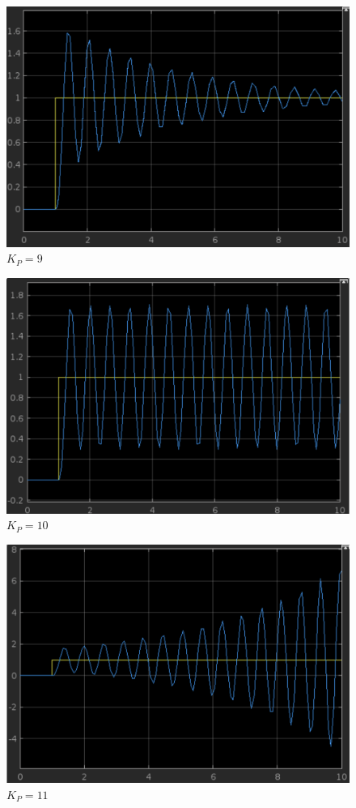 \documentclass{article}
\begin{document}
				\begin{figure}[h]
					\includegraphics[scale=0.225, center]{2_c_KP_9.png}
					\caption{$K_P = 9$}
					\label{fig24: Graph_c_KP_9}
				\end{figure}	
\newpage
				\begin{figure}[h]
					\includegraphics[scale=0.225, center]{2_c_KP_10.png}
					\caption{$K_P = 10$}
					\label{fig25: Graph_c_KP_10}
				\end{figure}				
				\begin{figure}[h]
					\includegraphics[scale=0.225, center]{2_c_KP_11.png}
					\caption{$K_P = 11$}
					\label{fig26: Graph_c_KP_11}
				\end{figure}	
\end{document}
